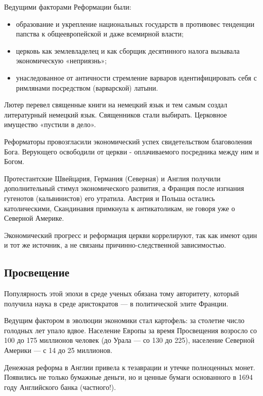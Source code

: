 Ведущими факторами Реформации были:

\begin{itemize}
\item 
образование и укрепление национальных государств в противовес тенденции папства к общеевропейской и даже всемирной
власти;
\item церковь как землевладелец и как сборщик десятинного налога вызывала экономическую «неприязнь»;
\item 
унаследованное от античности стремление варваров идентифицировать себя с римлянами посредством (варварской) латыни.
\end{itemize}

Лютер перевел священные книги на немецкий язык и тем самым создал литературный немецкий язык. Священников стали
выбирать. Церковное имущество «пустили в дело».


Реформаторы провозгласили экономический успех свидетельством благоволения Бога. Верующего освободили от церкви - оплачиваемого посредника между ним и Богом.


Протестантские Швейцария, Германия (Северная) и Англия получили дополнительный стимул экономического развития, а Франция
после изгнания гугенотов (кальвинистов) его утратила. Австрия и Польша остались католическими, Скандинавия примкнула к
антикатоликам, не говоря уже о Северной Америке.


Экономический прогресс и реформация церкви коррелируют, так как имеют один и тот же источник, а не связаны
причинно-следственной зависимостью.

\subsection[Просвещение ]{Просвещение}

Популярность этой эпохи в среде ученых обязана тому авторитету, который получила наука в среде аристократов — в
политической элите Франции.


Ведущим фактором в эволюции экономики стал картофель: за столетие число голодных лет упало вдвое. Население Европы за
время Просвещения возросло со 100 до 175 миллионов человек (до Урала — со 130 до 225), население Северной Америки — с
14 до 25 миллионов.


Денежная реформа в Англии привела к тезаврации и утечке полноценных монет. Появились не только бумажные деньги, но и
ценные бумаги основанного в 1694 году Английского банка (частного!).



